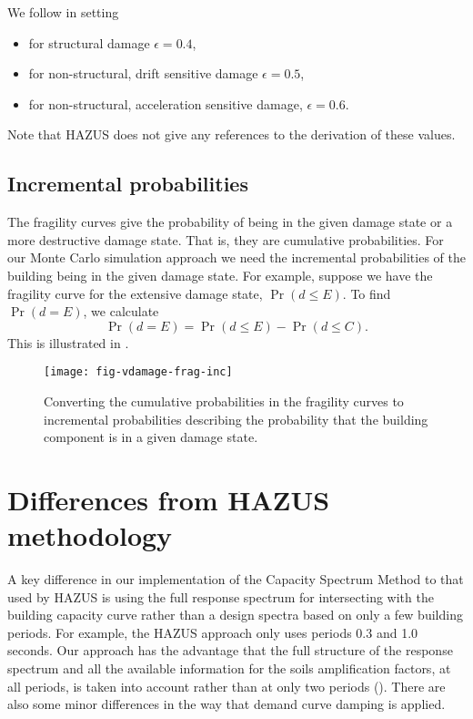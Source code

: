 We follow \cite{dr_FEMA99b} in setting
\begin{itemize}
\item for structural damage $\epsilon=0.4$, \item for
non-structural, drift sensitive damage $\epsilon=0.5$, \item for
non-structural, acceleration sensitive damage,
  $\epsilon=0.6$.
\end{itemize}
Note that HAZUS does not give any references to the derivation of
these values.


\subsection{Incremental probabilities}

The fragility curves give the probability
of being in the given damage state or a more destructive damage state. That is, they are
cumulative probabilities. For our Monte Carlo simulation approach
we need the incremental probabilities of the building being in the
given damage state. For example,  suppose we have the fragility
curve for the extensive damage state,
$\Pr(d \le E)$. To find $\Pr(d=E)$, we calculate
$$
\Pr(d=E) = \Pr(d\le E) - \Pr(d\le C).
$$
This is illustrated in .

\begin{figure}[htp]
\centering
{}
\texttt{[image: fig-vdamage-frag-inc]}
\caption{Converting the cumulative
  probabilities in the fragility curves to incremental probabilities
  describing the probability that the building component is in a given damage state.}
\label{fig:vdamage-frag-inc}
\end{figure}


\section{Differences from HAZUS methodology}


A key difference in our implementation of the Capacity Spectrum
Method to that used by HAZUS is
using the full response spectrum for intersecting with the
building capacity curve rather than a design
spectra based on only a few building periods. For example, the
HAZUS approach only uses periods 0.3 and 1.0 seconds. Our approach
has the advantage that the full structure of the response spectrum
and all the available information for the soils amplification
factors, at all periods, is taken into account rather than at only
two periods (). There are also some
minor differences in the way that demand curve damping is applied.

